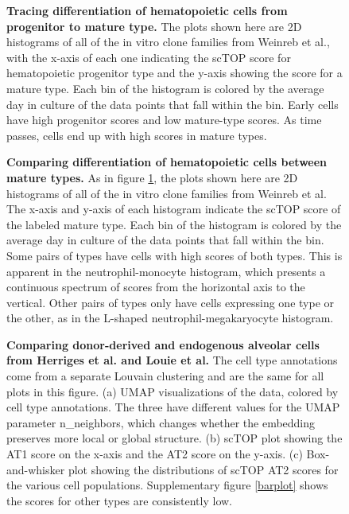 \documentclass[vruler,JEB]{COB}%
\begin{document}
\begin{figure}[h!]
	\centering
	\caption{\textbf{Tracing differentiation of hematopoietic cells from progenitor to mature type.} The plots shown here are 2D histograms of all of the in vitro clone families from Weinreb et al., with the x-axis of each one indicating the scTOP score for hematopoietic progenitor type and the y-axis showing the score for a mature type. Each bin of the histogram is colored by the average day in culture of the data points that fall within the bin. Early cells have high progenitor scores and low mature-type scores. As time passes, cells end up with high scores in mature types.}
	\label{hem progenitor}
\end{figure}

\begin{figure}[h!]
	\centering
	\caption{\textbf{Comparing differentiation of hematopoietic cells between mature types.} As in figure \ref{hem progenitor}, the plots shown here are 2D histograms of all of the in vitro clone families from Weinreb et al. The x-axis and y-axis of each histogram indicate the scTOP score of the labeled mature type. Each bin of the histogram is colored by the average day in culture of the data points that fall within the bin. Some pairs of types have cells with high scores of both types. This is apparent in the neutrophil-monocyte histogram, which presents a continuous spectrum of scores from the horizontal axis to the vertical. Other pairs of types only have cells expressing one type or the other, as in the L-shaped neutrophil-megakaryocyte histogram.}
	\label{hem mature}
\end{figure}

\begin{figure}[h!]
	\centering
	\caption{\textbf{Comparing donor-derived and endogenous alveolar cells from Herriges et al. and Louie et al.} The cell type annotations come from a separate Louvain clustering and are the same for all plots in this figure. (a) UMAP visualizations of the data, colored by cell type annotations. The three have different values for the UMAP parameter n\_neighbors, which changes whether the embedding preserves more local or global structure. (b) scTOP plot showing the AT1 score on the x-axis and the AT2 score on the y-axis. (c) Box-and-whisker plot showing the distributions of scTOP AT2 scores for the various cell populations. Supplementary figure \ref{barplot} shows the scores for other types are consistently low.}
	\label{engineered}
\end{figure}
\end{document}
